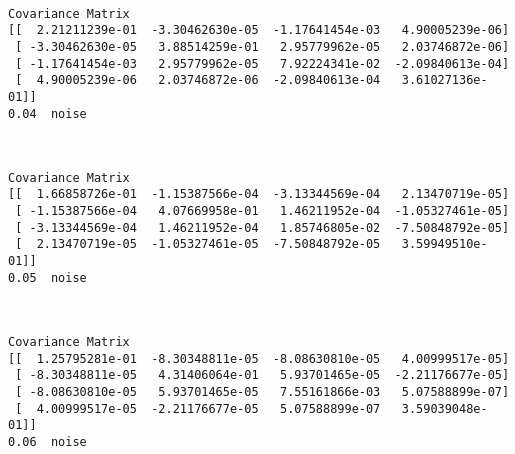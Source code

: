 \documentclass{article}
\begin{document}
    \begin{center}
    \end{center}
    { \hspace*{\fill} \\}
    
    \begin{Verbatim}[commandchars=\\\{\}]
Covariance Matrix
[[  2.21211239e-01  -3.30462630e-05  -1.17641454e-03   4.90005239e-06]
 [ -3.30462630e-05   3.88514259e-01   2.95779962e-05   2.03746872e-06]
 [ -1.17641454e-03   2.95779962e-05   7.92224341e-02  -2.09840613e-04]
 [  4.90005239e-06   2.03746872e-06  -2.09840613e-04   3.61027136e-01]]
0.04  noise
    \end{Verbatim}

    \begin{center}
    \end{center}
    { \hspace*{\fill} \\}
    
    \begin{Verbatim}[commandchars=\\\{\}]
Covariance Matrix
[[  1.66858726e-01  -1.15387566e-04  -3.13344569e-04   2.13470719e-05]
 [ -1.15387566e-04   4.07669958e-01   1.46211952e-04  -1.05327461e-05]
 [ -3.13344569e-04   1.46211952e-04   1.85746805e-02  -7.50848792e-05]
 [  2.13470719e-05  -1.05327461e-05  -7.50848792e-05   3.59949510e-01]]
0.05  noise
    \end{Verbatim}

    \begin{center}
    \end{center}
    { \hspace*{\fill} \\}
    
    \begin{Verbatim}[commandchars=\\\{\}]
Covariance Matrix
[[  1.25795281e-01  -8.30348811e-05  -8.08630810e-05   4.00999517e-05]
 [ -8.30348811e-05   4.31406064e-01   5.93701465e-05  -2.21176677e-05]
 [ -8.08630810e-05   5.93701465e-05   7.55161866e-03   5.07588899e-07]
 [  4.00999517e-05  -2.21176677e-05   5.07588899e-07   3.59039048e-01]]
0.06  noise
    \end{Verbatim}
\end{document}
